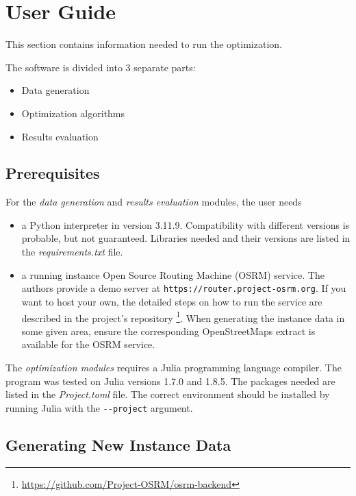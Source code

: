 \chapter{User Guide}\label{app:user}

This section contains information needed to run the optimization.

The software is divided into 3 separate parts:

\begin{itemize}
    \setlength\itemsep{0pt}
    \item Data generation
    \item Optimization algorithms
    \item Results evaluation
\end{itemize}

\section{Prerequisites}

For the \textit{data generation} and \textit{results evaluation} modules, the user needs
\begin{itemize}
    \setlength\itemsep{0pt}
    \item a Python interpreter in version 3.11.9. Compatibility with different versions is probable, but not guaranteed. Libraries needed and their versions are listed in the \textit{requirements.txt} file. 
    \item a running instance Open Source Routing Machine (OSRM) \cite{luxen-vetter-2011} service. The authors provide a demo server at \texttt{https://router.project-osrm.org}. If you want to host your own, the detailed steps on how to run the service are described in the project's repository \footnote{\url{https://github.com/Project-OSRM/osrm-backend}}. When generating the instance data in some given area, ensure the corresponding OpenStreetMaps extract is available for the OSRM service.
\end{itemize}

The \textit{optimization modules} requires a Julia programming language compiler. The program was tested on Julia versions 1.7.0 and 1.8.5. The packages needed are listed in the \textit{Project.toml} file. The correct environment should be installed by running Julia with the \texttt{-{}-project} argument.

\section{Generating New Instance Data}

